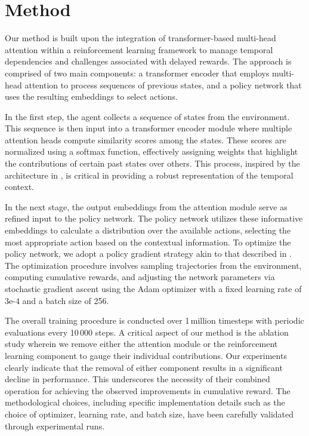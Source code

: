 \documentclass{article}
\begin{document}
\section{Method}
Our method is built upon the integration of transformer-based multi-head attention within a reinforcement learning framework to manage temporal dependencies and challenges associated with delayed rewards. The approach is comprised of two main components: a transformer encoder that employs multi-head attention to process sequences of previous states, and a policy network that uses the resulting embeddings to select actions. 

In the first step, the agent collects a sequence of states from the environment. This sequence is then input into a transformer encoder module where multiple attention heads compute similarity scores among the states. These scores are normalized using a softmax function, effectively assigning weights that highlight the contributions of certain past states over others. This process, inspired by the architecture in \cite{ashish_2017_attention}, is critical in providing a robust representation of the temporal context. 

In the next stage, the output embeddings from the attention module serve as refined input to the policy network. The policy network utilizes these informative embeddings to calculate a distribution over the available actions, selecting the most appropriate action based on the contextual information. To optimize the policy network, we adopt a policy gradient strategy akin to that described in . The optimization procedure involves sampling trajectories from the environment, computing cumulative rewards, and adjusting the network parameters via stochastic gradient ascent using the Adam optimizer with a fixed learning rate of 3e-4 and a batch size of 256. 

The overall training procedure is conducted over 1\,million timesteps with periodic evaluations every 10\,000 steps. A critical aspect of our method is the ablation study wherein we remove either the attention module or the reinforcement learning component to gauge their individual contributions. Our experiments clearly indicate that the removal of either component results in a significant decline in performance. This underscores the necessity of their combined operation for achieving the observed improvements in cumulative reward. The methodological choices, including specific implementation details such as the choice of optimizer, learning rate, and batch size, have been carefully validated through experimental runs.
\end{document}
